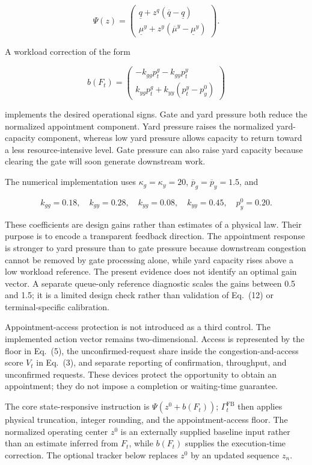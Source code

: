 \documentclass[preprint,12pt,authoryear,a4paper]{elsarticle}
\begin{document}
\[
\Psi(z)=
\begin{pmatrix}
\underline q+z^q(\overline q-\underline q)\\
\underline\mu^y+z^y(\overline\mu^y-\underline\mu^y)
\end{pmatrix}.
\tag{14}
\]

A workload correction of the form

\[
b(F_t)=
\begin{pmatrix}
-k_{gg}p_t^g-k_{gy}p_t^y\\
k_{yg}p_t^g+k_{yy}(p_t^y-p_y^0)
\end{pmatrix}
\tag{15}
\]

implements the desired operational signs. Gate and yard pressure both reduce the normalized appointment component. Yard pressure raises the normalized yard-capacity component, whereas low yard pressure allows capacity to return toward a less resource-intensive level. Gate pressure can also raise yard capacity because clearing the gate will soon generate downstream work.

The numerical implementation uses \(\kappa_g=\kappa_y=20\), \(\overline p_g=\overline p_y=1.5\), and

\[
k_{gg}=0.18,\quad
k_{gy}=0.28,\quad
k_{yg}=0.08,\quad
k_{yy}=0.45,\quad
p_y^0=0.20.
\tag{16}
\]

These coefficients are design gains rather than estimates of a physical law. Their purpose is to encode a transparent feedback direction. The appointment response is stronger to yard pressure than to gate pressure because downstream congestion cannot be removed by gate processing alone, while yard capacity rises above a low workload reference. The present evidence does not identify an optimal gain vector. A separate queue-only reference diagnostic scales the gains between 0.5 and 1.5; it is a limited design check rather than validation of Eq.~(12) or terminal-specific calibration.

Appointment-access protection is not introduced as a third control. The implemented action vector remains two-dimensional. Access is represented by the floor in Eq.~(5), the unconfirmed-request share inside the congestion-and-access score \(V_t\) in Eq.~(3), and separate reporting of confirmation, throughput, and unconfirmed requests. These devices protect the opportunity to obtain an appointment; they do not impose a completion or waiting-time guarantee.

The core state-responsive instruction is \(\Psi(z^0+b(F_t))\); \(\Gamma_t^{\mathrm{FB}}\) then applies physical truncation, integer rounding, and the appointment-access floor. The normalized operating center \(z^0\) is an externally supplied baseline input rather than an estimate inferred from \(F_t\), while \(b(F_t)\) supplies the execution-time correction. The optional tracker below replaces \(z^0\) by an updated sequence \(z_n\).
\end{document}
